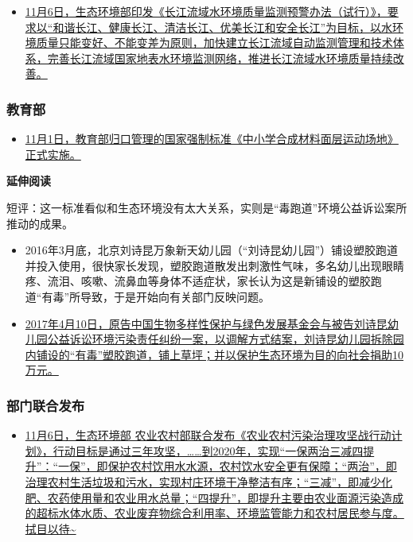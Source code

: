 \documentclass[
]{book}
\providecommand{\tightlist}{%
  \setlength{\itemsep}{0pt}\setlength{\parskip}{0pt}}
\begin{document}
\begin{itemize}
\tightlist
\item
  \href{http://www.ywrp.gov.cn/bzgf/6253.html}{11月6日，生态环境部印发《长江流域水环境质量监测预警办法（试行）》，要求以``和谐长江、健康长江、清洁长江、优美长江和安全长江''为目标，以水环境质量只能变好、不能变差为原则，加快建立长江流域自动监测管理和技术体系，完善长江流域国家地表水环境监测网络，推进长江流域水环境质量持续改善。}
\end{itemize}

\hypertarget{ux6559ux80b2ux90e8}{%
\subsubsection*{教育部}\label{ux6559ux80b2ux90e8}}

\begin{itemize}
\tightlist
\item
  \href{http://www.moe.gov.cn/srcsite/A17/moe_938/s3273/201811/t20181101_353337.htm}{11月1日，教育部归口管理的国家强制标准《中小学合成材料面层运动场地》正式实施。}
\end{itemize}

\textbf{延伸阅读}

短评：这一标准看似和生态环境没有太大关系，实则是``毒跑道''环境公益诉讼案所推动的成果。

\begin{itemize}
\item
  2016年3月底，北京刘诗昆万象新天幼儿园（``刘诗昆幼儿园''）铺设塑胶跑道并投入使用，很快家长发现，塑胶跑道散发出刺激性气味，多名幼儿出现眼睛疼、流泪、咳嗽、流鼻血等身体不适症状，家长认为这是新铺设的塑胶跑道``有毒''所导致，于是开始向有关部门反映问题。
\item
  \href{http://news.sina.com.cn/o/2018-02-05/doc-ifyreuzn3040514.shtml}{2017年4月10日，原告中国生物多样性保护与绿色发展基金会与被告刘诗昆幼儿园公益诉讼环境污染责任纠纷一案，以调解方式结案，刘诗昆幼儿园拆除园内铺设的``有毒''塑胶跑道，铺上草坪；并以保护生态环境为目的向社会捐助10万元。}
\end{itemize}

\hypertarget{ux90e8ux95e8ux8054ux5408ux53d1ux5e03}{%
\subsubsection*{部门联合发布}\label{ux90e8ux95e8ux8054ux5408ux53d1ux5e03}}

\begin{itemize}
\tightlist
\item
  \href{http://www.mee.gov.cn/xxgk2018/xxgk/xxgk03/201811/t20181108672959.htm}{11月6日，生态环境部 农业农村部联合发布《农业农村污染治理攻坚战行动计划》，行动目标是通过三年攻坚，\ldots\ldots 到2020年，实现``一保两治三减四提升''：``一保''，即保护农村饮用水水源，农村饮水安全更有保障；``两治''，即治理农村生活垃圾和污水，实现村庄环境干净整洁有序；``三减''，即减少化肥、农药使用量和农业用水总量；``四提升''，即提升主要由农业面源污染造成的超标水体水质、农业废弃物综合利用率、环境监管能力和农村居民参与度。拭目以待\textasciitilde{}}
\end{itemize}
\end{document}
